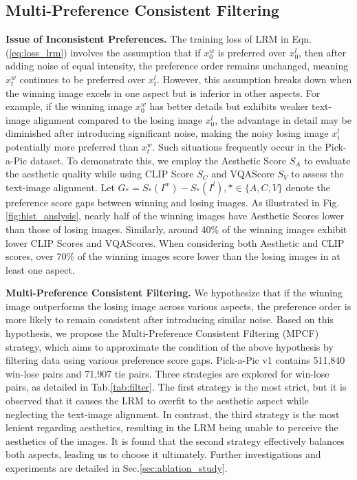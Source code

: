 \subsection{Multi-Preference Consistent Filtering}
\label{sec:lrm_train}

\textbf{Issue of Inconsistent Preferences.} The training loss of LRM in Eqn.\;(\ref{eq:loss_lrm}) involves the assumption that if $x^w_0$ is preferred over $x^l_0$, then after adding noise of equal intensity, the preference order remains unchanged, meaning $x^w_t$ continues to be preferred over $x^l_t$. However, this assumption breaks down when the winning image excels in one aspect but is inferior in other aspects. For example, if the winning image $x^w_0$ has better details but exhibits weaker text-image alignment compared to the losing image $x_0^l$, the advantage in detail may be diminished after introducing significant noise, making the noisy losing image $x_t^l$ potentially more preferred than $x_t^w$. Such situations frequently occur in the Pick-a-Pic \cite{pickscore} dataset. To demonstrate this, we employ the Aesthetic Score $S_A$ \cite{aesthetic} to evaluate the aesthetic quality while using CLIP Score $S_C$ \cite{clip} and VQAScore $S_V$ \cite{vqascore} to assess the text-image alignment. Let $G_*=S_*(I^w)-S_*(I^l), *\in \{A,C,V\}$ denote the preference score gaps between winning and losing images. As illustrated in Fig.\;\ref{fig:hist_anslysis}, nearly half of the winning images have Aesthetic Scores lower than those of losing images. Similarly, around 40\% of the winning images exhibit lower CLIP Scores and VQAScores. When considering both Aesthetic and CLIP scores, over 70\% of the winning images score lower than the losing images in at least one aspect. 

\textbf{Multi-Preference Consistent Filtering.} We hypothesize that if the winning image outperforms the losing image across various aspects, the preference order is more likely to remain consistent after introducing similar noise. Based on this hypothesis, we propose the Multi-Preference Consistent Filtering (MPCF) strategy, which aims to approximate the condition of the above hypothesis by filtering data using various preference score gaps. Pick-a-Pic v1 contains 511,840 win-lose pairs and 71,907 tie pairs. Three strategies are explored for win-lose pairs, as detailed in Tab.\;\ref{tab:filter}. The first strategy is the most strict, but it is observed that it causes the LRM to overfit to the aesthetic aspect while neglecting the text-image alignment. In contrast, the third strategy is the most lenient regarding aesthetics, resulting in the LRM being unable to perceive the aesthetics of the images. It is found that the second strategy effectively balances both aspects, leading us to choose it ultimately. Further investigations and experiments are detailed in Sec.\;\ref{sec:ablation_study}.



